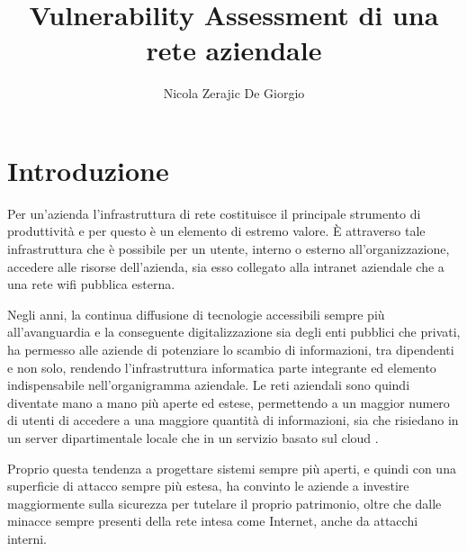 \documentclass[target=bach,aauheader=]{thud}
\title{Vulnerability Assessment di una rete aziendale}
\author{Nicola Zerajic De Giorgio}
\begin{document}
\maketitle

\tableofcontents


\listoffigures

\mainmatter


\chapter{Introduzione}

Per un’azienda l’infrastruttura di rete costituisce il principale strumento di produttività e per questo è un elemento di estremo valore. È attraverso tale infrastruttura che è possibile per un utente, interno o esterno all'organizzazione, accedere alle risorse dell'azienda, sia esso collegato alla intranet aziendale che a una rete wifi pubblica esterna.

Negli anni, la continua diffusione di tecnologie accessibili sempre più all’avanguardia e la conseguente digitalizzazione sia degli enti pubblici che privati, ha permesso alle aziende di potenziare lo scambio di informazioni, tra dipendenti e non solo, rendendo l’infrastruttura informatica parte integrante ed elemento indispensabile nell’organigramma aziendale. Le reti aziendali sono quindi diventate mano a mano più aperte ed estese, permettendo a un maggior numero di utenti di accedere a una maggiore quantità di informazioni, sia che risiedano in un server dipartimentale locale che in un servizio basato sul cloud \cite{cisco_top-down}.

Proprio questa tendenza a progettare sistemi sempre più aperti, e quindi con una superficie di attacco sempre più estesa, ha convinto le aziende a investire maggiormente sulla sicurezza per tutelare il proprio patrimonio, oltre che dalle minacce sempre presenti della rete intesa come Internet, anche da attacchi interni.
\end{document}
